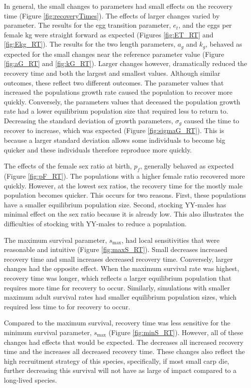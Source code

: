 \documentclass{article}[12pt]
\begin{document}
In general, the small changes to parameters had small effects on the recovery time (Figure \ref{fig:recoveryTimes}).
The effects of larger changes varied by parameter.
The results for the egg transition parameter, \(e_t\), and the eggs per female kg were straight forward as expected (Figures \ref{fig:ET_RT} and \ref{fig:Ekg_RT}).
The results for the two length parameters, \(a_g\) and \(k_g\), behaved as expected for the small changes near the reference parameter value (Figure \ref{fig:aG_RT} and \ref{fig:kG_RT}).
Larger changes however, dramatically reduced the recovery time and both the largest and smallest values.
Although similar outcomes, these reflect two different outcomes.
The parameter values that increased the populations growth rate caused the population to recover more quickly.
Conversely, the parameters values that deceased the population growth rate had a lower equilibrium population size that required less to return to.
Decreasing the standard deviation of growth parameters, \(\sigma_g\) caused the time to recover to increase, which was expected (Figure \ref{fig:sigmaG_RT}).
This is because a larger standard deviation allows some individuals to become big quicker and these individuals therefore reproduce more quickly.


The effects of the female sex ratio at birth, \(p_f\), generally behaved as expected (Figure \ref{fig:pF_RT}).
The populations with a higher female ratio recovered more quickly. 
However, at the lowest sex ratios, the recovery time for the mostly male population becomes quicker.
This occurs for two reasons.
First, these populations have a smaller equilibrium population size. 
Second, stocking YY-males has minimal effect on the sex ratio because it is already low. 
This also illustrates the difficulties of stocking with YY-males to reduce a population. 

The maximum survival parameter, \(s_\text{max}\), had local sensitivities that were reasonable and intuitive (Figure \ref{fig:maxS_RT}).
Small decreases increased recovery time and small increases decreased recovery time.
Conversely, larger changes had the opposite effect.
When the maximum survival rate was highest, recovery time was longer, which reflects a larger equilibrium population that requires more time for recovery to occur. 
Similarly, simulations with smaller maximum adult survival rates had smaller equilibrium population sizes, which required less time to for recovery to occur.

Compared to the maximum survival, recovery time was less sensitive for the minimum survival parameter, \(s_\text{max}\) (Figure \ref{fig:minS_RT}).
However, all of these changes had effects that would be expected. 
The decreases all increased recovery time and the increases all decreased recovery time. 
These changes also reflect the high recruitment strategy \citep[e.g., an \(r\) versus \(k\) species;][]{Gotelli:2008} of this species, specifically, if most small carp die, further decreasing this survival will not have as large of impact compared to a long-lived species.
\end{document}
